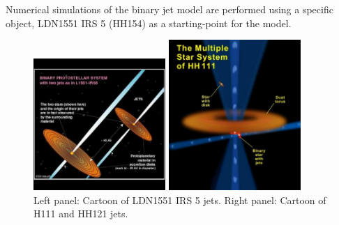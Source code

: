 
%
%


Numerical simulations of the binary jet model are performed using a specific object, LDN1551 IRS 5 (HH154) as a starting-point for the model.





\begin{figure}[t]
\begin{center}
   \begin{minipage}[c]{.48\linewidth}
\includegraphics[width=5cm]{schematic_l1551}
   \end{minipage} \hfill
   \begin{minipage}[c]{.48\linewidth}
\includegraphics[width=5cm]{schematic_hh111}
   \end{minipage} \hfill

\caption{
Left panel:
Cartoon of LDN1551 IRS 5 jets.
Right panel: 
Cartoon of H111 and HH121 jets.
}
\label{fig:SchemeH111} 
\end{center}
\end{figure}




